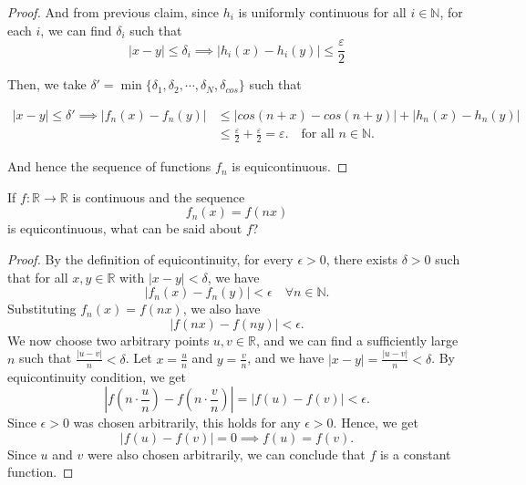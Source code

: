 \begin{proof}
    And from previous claim, since $h_i$ is uniformly continuous for all $i \in \mathbb{N}$, for each $i$, we can find $\delta_i$ such that
    \[
        \lvert x -y \rvert \le \delta_i \implies \lvert h_i(x) - h_i(y)\rvert \le \frac{\varepsilon}{2}
    \]

    Then, we take $\delta' = \min\{\delta_1, \delta_2,\cdots, \delta_N, \delta_{cos}\}$ such that
    
    \[
        \begin{aligned}
            \lvert x-y \rvert \le \delta' \implies \lvert f_n(x) - f_n(y) \rvert &\le \lvert cos(n+x) - cos(n+y)\rvert + \lvert h_n(x) - h_n(y)\rvert \\
            &\le \frac{\varepsilon}{2} + \frac{\varepsilon}{2} = \varepsilon. \quad \text{for all } n\in \mathbb{N}. 
        \end{aligned}
    \]

    And hence the sequence of functions $f_n$ is equicontinuous.
    
    
\end{proof}

\begin{problem}
    If \(f:\mathbb R\to\mathbb R\) is continuous and the sequence
    \[
    f_n(x)=f(nx)
    \]
    is equicontinuous, what can be said about \(f\)?
\end{problem}

\begin{proof}
    By the definition of equicontinuity, for every $\epsilon > 0$, there exists $\delta > 0$ such that for all $x, y \in \mathbb{R}$ with $|x - y| < \delta$, we have
    \[
    |f_n(x) - f_n(y)| < \epsilon \quad \forall n \in \mathbb{N}.
    \]
    Substituting $f_n(x)=f(nx)$, we also have
    \[
    |f(nx) - f(ny)| < \epsilon.
    \]
    We now choose two arbitrary points $u, v \in \mathbb{R}$, and we can find a sufficiently large $n$ such that $\frac{|u - v|}{n} < \delta$. Let $x = \frac{u}{n}$ and $y = \frac{v}{n}$, and we have $|x - y| = \frac{|u - v|}{n} < \delta$. By equicontinuity condition, we get
    \[
    \left| f\left(n \cdot \frac{u}{n}\right) - f\left(n \cdot \frac{v}{n}\right) \right| = |f(u) - f(v)| < \epsilon.
    \]
    Since $\epsilon > 0$ was chosen arbitrarily, this holds for any $\epsilon > 0$. Hence, we get
    \[
    |f(u) - f(v)| = 0 \implies f(u) = f(v).
    \]
    Since $u$ and $v$ were also chosen arbitrarily, we can conclude that $f$ is a constant function.
\end{proof}